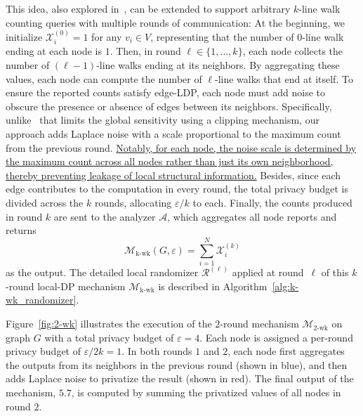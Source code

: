 This idea, {also explored in~\cite{betzer2024publishing}}, can be extended to support arbitrary $k$-line walk counting queries with multiple rounds of communication: 
At the beginning, we initialize $\mathcal{X}^{(0)}_i =1$ for any $v_i\in V$, representing that the number of $0$-line walk ending at each node is $1$.
Then, in round $\ell \in \{1, \dots, k\}$, each node collects the number of $(\ell-1)$-line walks ending at its neighbors.
By aggregating these values, each node can compute the number of $\ell$-line walks that end at itself.
To ensure the reported counts satisfy edge-LDP, each node must add noise to obscure the presence or absence of edges between its neighbors.
Specifically, {unlike~\cite{betzer2024publishing} that limits the global sensitivity using a clipping mechanism,}
our approach adds Laplace noise with a scale proportional to the maximum count from the previous round.
\uline{Notably, for each node, the noise scale is determined by the maximum count across all nodes rather than just its own neighborhood, thereby preventing leakage of local structural information.}
Besides, since each edge contributes to the computation in every round, the total privacy budget is divided across the $k$ rounds, allocating $\varepsilon/k$ to each.
Finally, the counts produced in round $k$ are sent to the analyzer $\mathcal{A}$, which aggregates all node reports and returns 
\begin{equation*}
\label{e:k_owk_output}
     \mathcal{M}_{\mathrm{k\text{-}wk}}(G,\varepsilon) =  \sum_{i=1}^N \mathcal{X}^{(k)}_i
\end{equation*}
as the output.
The detailed local randomizer $\mathcal{R}^{(\ell)}$ applied at round~$\ell$ of this $k$-round local-DP mechanism $\mathcal{M}_{\mathrm{k\text{-}wk}}$ is described in Algorithm~\ref{alg:k-wk_randomizer}. 



Figure~\ref{fig:2-wk} illustrates the execution of the $2$-round mechanism $\mathcal{M}_{\mathrm{2\text{-}wk}}$ on graph $G$ with a total privacy budget of $\varepsilon = 4$.
Each node is assigned a per-round privacy budget of $\varepsilon / 2k = 1$.
In both rounds $1$ and $2$, each node first aggregates the outputs from its neighbors in the previous round (shown in blue), and then adds Laplace noise to privatize the result (shown in red).
The final output of the mechanism, $5.7$, is computed by summing the privatized values of all nodes in round $2$.



